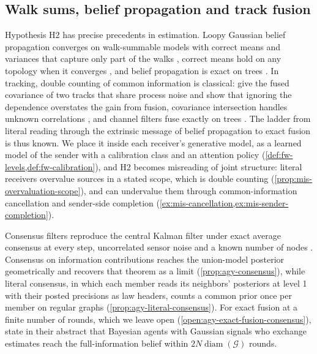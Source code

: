 \subsection{Walk sums, belief propagation and track fusion}\label{sec:rel-fusion}

Hypothesis H2 has precise precedents in estimation. Loopy Gaussian belief propagation converges on walk-summable models with correct means and variances that capture only part of the walks \citep{malioutov2006walk}, correct means hold on any topology when it converges \citep{weiss2001correctness}, and belief propagation is exact on trees \citep{pearl1988probabilistic}. In tracking, double counting of common information is classical: \citet{barshalom1986effect} give the fused covariance of two tracks that share process noise and show that ignoring the dependence overstates the gain from fusion, covariance intersection handles unknown correlations \citep{julier1997nondivergent}, and channel filters fuse exactly on trees \citep{grime1994data}. The ladder from literal reading through the extrinsic message of belief propagation to exact fusion is thus known. We place it inside each receiver's generative model, as a learned model of the sender with a calibration class and an attention policy (\cref{def:fw-levels,def:fw-calibration}), and H2 becomes misreading of joint structure: literal receivers overvalue sources in a stated scope, which is double counting (\cref{prop:mis-overvaluation-scope}), and can undervalue them through common-information cancellation and sender-side completion (\cref{ex:mis-cancellation,ex:mis-sender-completion}).

Consensus filters reproduce the central Kalman filter under exact average consensus at every step, uncorrelated sensor noise and a known number of nodes \citep[Theorem~1]{olfatisaber2005distributed}. Consensus on information contributions reaches the union-model posterior geometrically and recovers that theorem as a limit (\cref{prop:agy-consensus}), while literal consensus, in which each member reads its neighbors' posteriors at level 1 with their posted precisions as law headers, counts a common prior once per member on regular graphs (\cref{prop:agy-literal-consensus}). For exact fusion at a finite number of rounds, which we leave open (\cref{open:agy-exact-fusion-consensus}), \citet{mossel2016efficient} state in their abstract that Bayesian agents with Gaussian signals who exchange estimates reach the full-information belief within $2N\operatorname{diam}(\mathcal G)$ rounds.

